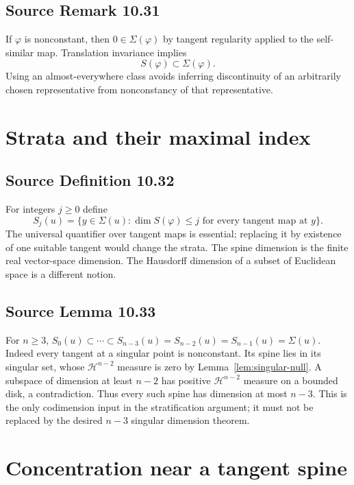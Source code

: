 \documentclass[11pt,a4paper]{article}
\numberwithin{equation}{section}
\theoremstyle{definition}
\theoremstyle{remark}
\newcommand{\HH}{\mathcal H}
\begin{document}
\subsection{Source Remark 10.31}\label{lem:spine-singular}
If $\varphi$ is nonconstant, then $0\in\Sigma(\varphi)$ by tangent
regularity applied to the self-similar map. Translation invariance implies
\begin{equation}\label{eq:spine-singular}
 S(\varphi)\subset\Sigma(\varphi).
\end{equation}
Using an almost-everywhere class avoids inferring discontinuity of an
arbitrarily chosen representative from nonconstancy of that representative.

\section{Strata and their maximal index}
\subsection{Source Definition 10.32}\label{def:strata}
For integers $j\ge0$ define
\[
 S_j(u)=\{y\in\Sigma(u):
       \dim S(\varphi)\le j\text{ for every tangent map at }y\}.
\]
The universal quantifier over tangent maps is essential; replacing it by
existence of one suitable tangent would change the strata.
The spine dimension is the finite real vector-space dimension. The
Hausdorff dimension of a subset of Euclidean space is a different notion.

\subsection{Source Lemma 10.33}\label{lem:strata-top}
For $n\ge3$,
$S_0(u)\subset\cdots\subset S_{n-3}(u)
=S_{n-2}(u)=S_{n-1}(u)=\Sigma(u)$.
Indeed every tangent at a singular point is nonconstant. Its spine lies in
its singular set, whose $\HH^{n-2}$ measure is zero by
Lemma~\ref{lem:singular-null}. A subspace of dimension at least $n-2$
has positive $\HH^{n-2}$ measure on a bounded disk, a contradiction.
Thus every such spine has dimension at most $n-3$.
This is the only codimension input in the stratification argument; it
must not be replaced by the desired $n-3$ singular dimension theorem.

\section{Concentration near a tangent spine}
\end{document}
